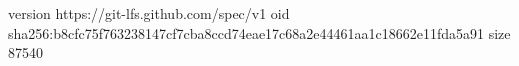 version https://git-lfs.github.com/spec/v1
oid sha256:b8cfc75f763238147cf7cba8ccd74eae17c68a2e44461aa1c18662e11fda5a91
size 87540
